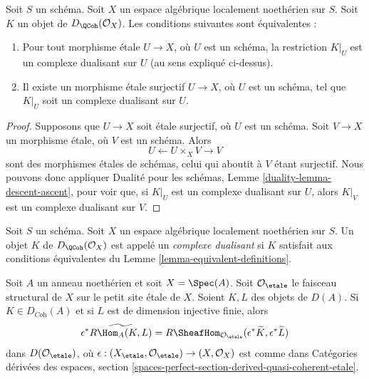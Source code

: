 \begin{lemma}
\label{lemma-equivalent-definitions}
Soit $S$ un schéma. Soit $X$ un espace algébrique localement noethérien sur $S$.
Soit $K$ un objet de $D_\QCoh(\mathcal{O}_X)$. Les conditions suivantes sont équivalentes :
\begin{enumerate}
\item Pour tout morphisme \'etale $U \to X$, où $U$ est un schéma,
la restriction $K|_U$ est un complexe dualisant sur $U$ (au sens expliqué ci-dessus).
\item Il existe un morphisme \'etale surjectif $U \to X$, où $U$ est un
schéma, tel que $K|_U$ soit un complexe dualisant sur $U$.
\end{enumerate}
\end{lemma}

\begin{proof}
Supposons que $U \to X$ soit \'etale surjectif, où $U$ est un schéma.
Soit $V \to X$ un morphisme \'etale, où $V$ est un schéma.
Alors
$$
U \leftarrow U \times_X V \rightarrow V
$$
sont des morphismes \'etales de schémas, celui qui aboutit à $V$ étant surjectif.
Nous pouvons donc appliquer Dualité pour les schémas, Lemme \ref{duality-lemma-descent-ascent},
pour voir que, si $K|_U$ est un complexe dualisant sur $U$, alors
$K|_V$ est un complexe dualisant sur $V$.
\end{proof}

\begin{definition}
\label{definition-dualizing-scheme}
Soit $S$ un schéma.
Soit $X$ un espace algébrique localement noethérien sur $S$.
Un objet $K$ de $D_\QCoh(\mathcal{O}_X)$ est appelé un
{\it complexe dualisant} si $K$ satisfait aux conditions équivalentes du
Lemme \ref{lemma-equivalent-definitions}.
\end{definition}

\begin{lemma}
\label{lemma-affine-duality}
Soit $A$ un anneau noethérien et soit $X = \Spec(A)$. Soit
$\mathcal{O}_\etale$ le faisceau structural de $X$ sur le
petit site \'etale de $X$. Soient $K, L$ des objets de $D(A)$.
Si $K \in D_{\textit{Coh}}(A)$ et si $L$ est de dimension injective
finie, alors
$$
\epsilon^*\widetilde{R\Hom_A(K, L)} =
R\SheafHom_{\mathcal{O}_\etale}(\epsilon^*\widetilde{K},
\epsilon^*\widetilde{L})
$$
dans $D(\mathcal{O}_\etale)$, où
$\epsilon : (X_\etale, \mathcal{O}_\etale) \to (X, \mathcal{O}_X)$
est comme dans Catégories dérivées des espaces, section
\ref{spaces-perfect-section-derived-quasi-coherent-etale}.
\end{lemma}

